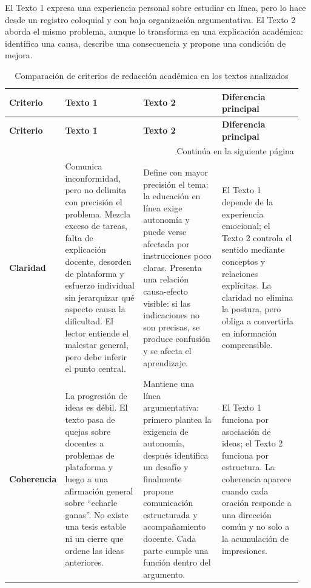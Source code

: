 \documentclass[
	spanish, %
	letterpaper, oneside
]{article}
\begin{document}
El Texto 1 expresa una experiencia personal sobre estudiar en línea, pero lo hace desde un registro coloquial y con baja organización argumentativa. El Texto 2 aborda el mismo problema, aunque lo transforma en una explicación académica: identifica una causa, describe una consecuencia y propone una condición de mejora.

\clearpage
\pagestyle{empty}
\begin{landscape}
\begingroup
\scriptsize
\setlength{\tabcolsep}{4pt}
\renewcommand{\arraystretch}{1.35}
\begin{longtable}{@{}p{0.14\linewidth}p{0.27\linewidth}p{0.27\linewidth}p{0.28\linewidth}@{}}
\caption{Comparación de criterios de redacción académica en los textos analizados}
\label{tab:comparacion-redaccion-academica}\\
\toprule
\textbf{Criterio} & \textbf{Texto 1} & \textbf{Texto 2} & \textbf{Diferencia principal} \\
\midrule
\endfirsthead
\toprule
\textbf{Criterio} & \textbf{Texto 1} & \textbf{Texto 2} & \textbf{Diferencia principal} \\
\midrule
\endhead
\midrule
\multicolumn{4}{r}{Continúa en la siguiente página} \\
\endfoot
\bottomrule
\endlastfoot

\textbf{Claridad} &
Comunica inconformidad, pero no delimita con precisión el problema. Mezcla exceso de tareas, falta de explicación docente, desorden de plataforma y esfuerzo individual sin jerarquizar qué aspecto causa la dificultad. El lector entiende el malestar general, pero debe inferir el punto central. &
Define con mayor precisión el tema: la educación en línea exige autonomía y puede verse afectada por instrucciones poco claras. Presenta una relación causa-efecto visible: si las indicaciones no son precisas, se produce confusión y se afecta el aprendizaje. &
El Texto 1 depende de la experiencia emocional; el Texto 2 controla el sentido mediante conceptos y relaciones explícitas. La claridad no elimina la postura, pero obliga a convertirla en información comprensible. \\
\midrule

\textbf{Coherencia} &
La progresión de ideas es débil. El texto pasa de quejas sobre docentes a problemas de plataforma y luego a una afirmación general sobre ``echarle ganas''. No existe una tesis estable ni un cierre que ordene las ideas anteriores. &
Mantiene una línea argumentativa: primero plantea la exigencia de autonomía, después identifica un desafío y finalmente propone comunicación estructurada y acompañamiento docente. Cada parte cumple una función dentro del argumento. &
El Texto 1 funciona por asociación de ideas; el Texto 2 funciona por estructura. La coherencia aparece cuando cada oración responde a una dirección común y no solo a la acumulación de impresiones. \\
\midrule


\end{longtable}
\end{landscape}
\end{document}
